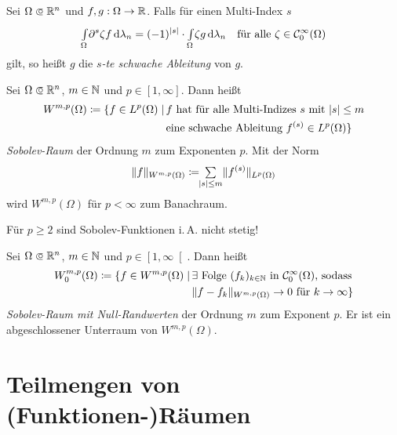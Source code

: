 \documentclass{cheat-sheet}
\begin{document}

\begin{defn}
  Sei $\Omega \opn \R^n$ und $f, g : \Omega \to \mathbb{R}$. Falls für einen Multi-Index $s$
  \[
    {\textstyle \int\limits_{\Omega}^{}} \partial^s \zeta f \,\mathrm{d} \lambda_n = (-1)^{\lvert s\rvert} \cdot {\textstyle \int\limits_{\Omega}^{}} \zeta g \,\mathrm{d} \lambda_n 
    \quad
    \text{für alle } \zeta \in \mathcal{C}_0^\infty(\Omega)
  \]
  gilt, so heißt $g$ die \emph{$s$-te schwache Ableitung} von $g$.
\end{defn}


\begin{defn}
  Sei $\Omega \opn \R^n$, $m \in \mathbb{N}$ und $p \in \left[ 1, \infty \right]$. Dann heißt
  \begin{align*}
    W^{m,p}(\Omega) \coloneqq \{ f \in L^p(\Omega) \mid \, &\text{$f$ hat für alle Multi-Indizes $s$ mit $\lvert s\rvert \leq m$}\\
    &\text{eine schwache Ableitung $f^{(s)} \in L^p(\Omega)$} \}
  \end{align*}
  \emph{Sobolev-Raum} der Ordnung $m$ zum Exponenten $p$. Mit der Norm
  \[ \norm{f}_{W^{m,p}(\Omega)} \coloneqq \!\! \sum_{\abs{s} \leq m} \norm{f^{(s)}}_{L^p(\Omega)} \]
  wird $W^{m,p}(\Omega)$ für $p < \infty$ zum Banachraum.
\end{defn}

\begin{samepage}


\begin{bem}
  Für $p \geq 2$ sind Sobolev-Funktionen i.\,A. nicht stetig!
\end{bem}

\begin{defn}
  Sei $\Omega \opn \R^n$, $m \in \mathbb{N}$ und $p \in \left[ 1, \infty \right[$. Dann heißt
  \begin{align*}
    W^{m,p}_0(\Omega) \coloneqq \{ f \in W^{m,p}(\Omega) \mid \, &\text{$\exists$ Folge $(f_k)_{k \in \mathbb{N}}$ in $\mathcal{C}_0^\infty(\Omega)$, sodass}\\
    &\lVert f - f_k\rVert_{W^{m,p}(\Omega)} \to 0 \text{ für } k \to \infty \}
  \end{align*}
  \emph{Sobolev-Raum mit Null-Randwerten} der Ordnung $m$ zum Exponent $p$. Er ist ein abgeschlossener Unterraum von $W^{m,p}(\Omega)$.
\end{defn}

\section{Teilmengen von (Funktionen-)Räumen}

\end{samepage}
\end{document}
